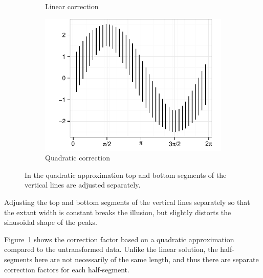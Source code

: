 \documentclass[11pt]{isuthesis}\usepackage[]{graphicx}\usepackage[]{color}
\newenvironment{knitrout}{}{} %
\begin{document}
\begin{figure}
\begin{subfigure}[b]{.32\linewidth}
\begin{knitrout}
{}



\end{knitrout}
\caption{Linear correction}
\end{subfigure}
\begin{subfigure}[b]{.32\linewidth}\centering
\begin{knitrout}
\color{fgcolor}

{\centering \includegraphics[width=\linewidth]{Figure/sineIllusion/fig-CtsAdjustedResults-1} 

}



\end{knitrout}
\caption{Quadratic correction}
\end{subfigure}
\caption[Quadratic Approximation]{
In the quadratic approximation top and bottom segments of the vertical lines are adjusted separately.}
\label{fig:GeneralQuadraticCorrection} 
\end{figure}

Adjusting the top and bottom segments of the vertical lines separately so that the extant width is constant breaks the illusion, but slightly distorts the sinusoidal shape of the peaks.

Figure~\ref{fig:GeneralQuadraticCorrection} shows the correction factor based on a quadratic approximation compared to the untransformed data. 
Unlike the linear solution, the half-segments here are not necessarily of the same length, and thus there are separate correction factors for each half-segment. 
\end{document}
